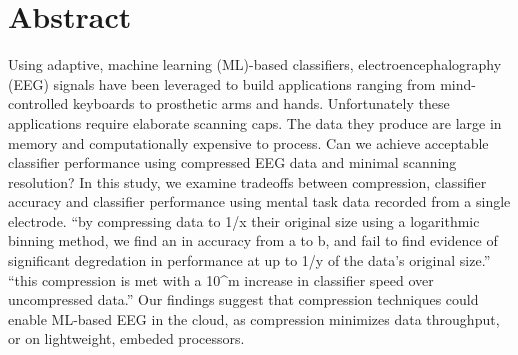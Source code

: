 
\section{Abstract}

Using adaptive, machine learning (ML)-based classifiers, electroencephalography (EEG) signals have been leveraged to build applications ranging from mind-controlled keyboards to prosthetic arms and hands. Unfortunately these applications require elaborate scanning caps. The data they produce are large in memory and computationally expensive to process. Can we achieve acceptable classifier performance using compressed EEG data and minimal scanning resolution? In this study, we examine tradeoffs between compression, classifier accuracy and classifier performance using mental task data recorded from a single electrode. ``by compressing data to 1/x their original size using a logarithmic binning method, we find an  in accuracy from a to b, and fail to find evidence of significant degredation in performance at up to 1/y of the data's original size.''  ``this compression is met with a 10^m increase in classifier speed over uncompressed data.''  Our findings suggest that compression techniques could enable ML-based EEG in the cloud, as compression minimizes data throughput, or on lightweight, embeded processors.